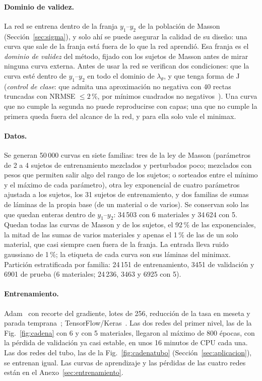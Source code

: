 \paragraph{Dominio de validez.} La red se entrena dentro de la franja $y_1$--$y_2$ de la población de Masson (Sección~\ref{sec:sigma}), y solo ahí se puede asegurar la calidad de su diseño: una curva que sale de la franja está fuera de lo que la red aprendió. Esa franja es el \emph{dominio de validez} del método, fijado con los sujetos de Masson antes de mirar ninguna curva externa. Antes de usar la red se verifican dos condiciones: que la curva esté dentro de $y_1$--$y_2$ en todo el dominio de $\lambda_\theta$, y que tenga forma de J (\emph{control de clase}: que admita una aproximación no negativa con 40 rectas truncadas con NRMSE $\le2$\,\%, por mínimos cuadrados no negativos~\cite{lawson}). Una curva que no cumple la segunda no puede reproducirse con capas; una que no cumple la primera queda fuera del alcance de la red, y para ella solo vale el minimax.

\paragraph{Datos.} Se generan 50\,000 curvas en siete familias: tres de la ley de Masson (parámetros de 2 a 4 sujetos de entrenamiento mezclados y perturbados poco; mezclados con pesos que permiten salir algo del rango de los sujetos; o sorteados entre el mínimo y el máximo de cada parámetro), otra ley exponencial de cuatro parámetros ajustada a los sujetos, los 31 sujetos de entrenamiento, y dos familias de sumas de láminas de la propia base (de un material o de varios). Se conservan solo las que quedan enteras dentro de $y_1$--$y_2$: 34\,503 con 6 materiales y 34\,624 con 5. Quedan todas las curvas de Masson y de los sujetos, el 92\,\% de las exponenciales, la mitad de las sumas de varios materiales y apenas el 1\,\% de las de un solo material, que casi siempre caen fuera de la franja. La entrada lleva ruido gaussiano de 1\,\%; la etiqueta de cada curva son sus láminas del minimax. Partición estratificada por familia: 24\,151 de entrenamiento, 3451 de validación y 6901 de prueba (6 materiales; 24\,236, 3463 y 6925 con 5).

\paragraph{Entrenamiento.} Adam~\cite{adam} con recorte del gradiente, lotes de 256, reducción de la tasa en meseta y parada temprana~\cite{prechelt}; TensorFlow/Keras~\cite{tf}. Las dos redes del primer nivel, las de la Fig.~\ref{fig:cadena} con 6 y con 5 materiales, llegaron al máximo de 800 épocas, con la pérdida de validación ya casi estable, en unos 16 minutos de CPU cada una. Las dos redes del tubo, las de la Fig.~\ref{fig:cadenatubo} (Sección~\ref{sec:aplicacion}), se entrenan igual. Las curvas de aprendizaje y las pérdidas de las cuatro redes están en el Anexo~\ref{sec:entrenamiento}.

